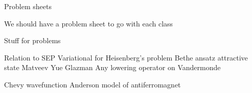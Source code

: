 
Problem sheets

We should have a problem sheet to go with each class

Stuff for problems

Relation to SEP
Variational for Heisenberg's problem
Bethe ansatz attractive state
Matveev Yue Glazman
Any lowering operator on Vandermonde

Chevy wavefunction
Anderson model of antiferromagnet